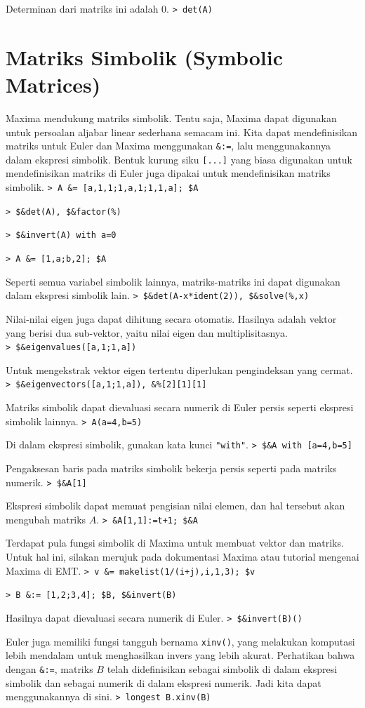 \documentclass[11pt, a4paper]{article}
\newcommand{\emtcmd}[1]{\noindent\texttt{\textcolor{emtcommand}{>}\ #1}\par\smallskip}
\begin{document}
Determinan dari matriks ini adalah 0.
\emtcmd{det(A)}

\section*{Matriks Simbolik (Symbolic Matrices)}

Maxima mendukung matriks simbolik. Tentu saja, Maxima dapat digunakan untuk persoalan aljabar linear sederhana semacam ini. Kita dapat mendefinisikan matriks untuk Euler dan Maxima menggunakan \texttt{\&:=}, lalu menggunakannya dalam ekspresi simbolik. Bentuk kurung siku \texttt{[...]} yang biasa digunakan untuk mendefinisikan matriks di Euler juga dipakai untuk mendefinisikan matriks simbolik.
\emtcmd{A \&= [a,1,1;1,a,1;1,1,a]; \$A}
\emtcmd{\$\&det(A), \$\&factor(\%)}
\emtcmd{\$\&invert(A) with a=0}
\emtcmd{A \&= [1,a;b,2]; \$A}

Seperti semua variabel simbolik lainnya, matriks-matriks ini dapat digunakan dalam ekspresi simbolik lain.
\emtcmd{\$\&det(A-x*ident(2)), \$\&solve(\%,x)}

Nilai-nilai eigen juga dapat dihitung secara otomatis. Hasilnya adalah vektor yang berisi dua sub-vektor, yaitu nilai eigen dan multiplisitasnya.
\emtcmd{\$\&eigenvalues([a,1;1,a])}

Untuk mengekstrak vektor eigen tertentu diperlukan pengindeksan yang cermat.
\emtcmd{\$\&eigenvectors([a,1;1,a]), \&\%[2][1][1]}

Matriks simbolik dapat dievaluasi secara numerik di Euler persis seperti ekspresi simbolik lainnya.
\emtcmd{A(a=4,b=5)}

Di dalam ekspresi simbolik, gunakan kata kunci \texttt{"with"}.
\emtcmd{\$\&A with [a=4,b=5]}

Pengaksesan baris pada matriks simbolik bekerja persis seperti pada matriks numerik.
\emtcmd{\$\&A[1]}

Ekspresi simbolik dapat memuat pengisian nilai elemen, dan hal tersebut akan mengubah matriks $A$.
\emtcmd{\&A[1,1]:=t+1; \$\&A}

Terdapat pula fungsi simbolik di Maxima untuk membuat vektor dan matriks. Untuk hal ini, silakan merujuk pada dokumentasi Maxima atau tutorial mengenai Maxima di EMT.
\emtcmd{v \&= makelist(1/(i+j),i,1,3); \$v}
\emtcmd{B \&:= [1,2;3,4]; \$B, \$\&invert(B)}

Hasilnya dapat dievaluasi secara numerik di Euler.
\emtcmd{\$\&invert(B)()}

Euler juga memiliki fungsi tangguh bernama \texttt{xinv()}, yang melakukan komputasi lebih mendalam untuk menghasilkan invers yang lebih akurat. Perhatikan bahwa dengan \texttt{\&:=}, matriks $B$ telah didefinisikan sebagai simbolik di dalam ekspresi simbolik dan sebagai numerik di dalam ekspresi numerik. Jadi kita dapat menggunakannya di sini.
\emtcmd{longest B.xinv(B)}
\end{document}
